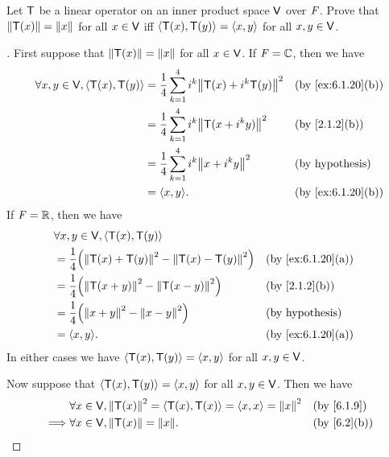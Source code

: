 \begin{ex}\label{ex:6.3.10}
  Let \(\mathsf{T}\) be a linear operator on an inner product space \(\mathsf{V}\) over \(\mathit{F}\).
  Prove that \(\left\lVert\mathsf{T}(x)\right\rVert = \left\lVert x\right\rVert\) for all \(x \in \mathsf{V}\) iff \(\left\langle\mathsf{T}(x), \mathsf{T}(y)\right\rangle = \left\langle x,y\right\rangle\) for all \(x, y \in \mathsf{V}\).
\end{ex}

\begin{proof}[]
  First suppose that \(\left\lVert\mathsf{T}(x)\right\rVert = \left\lVert x\right\rVert\) for all \(x \in \mathsf{V}\).
  If \(\mathit{F} = \mathbb{C}\), then we have
  \begin{align*}
    \forall x, y \in \V, \inn{\T(x), \T(y)} & = \dfrac{1}{4} \sum_{k = 1}^4 i^k \norm{\T(x) + i^k \T(y)}^2 &  & \by{ex:6.1.20}[b]      \\
                                            & = \dfrac{1}{4} \sum_{k = 1}^4 i^k \norm{\T(x + i^k y)}^2     &  & \by{2.1.2}[b]          \\
                                            & = \dfrac{1}{4} \sum_{k = 1}^4 i^k \norm{x + i^k y}^2         &  & \text{(by hypothesis)} \\
                                            & = \inn{x, y}.                                                &  & \by{ex:6.1.20}[b]
  \end{align*}
  If \(\mathit{F} = \mathbb{R}\), then we have
  \begin{align*}
     & \forall x, y \in \V, \inn{\T(x), \T(y)}                                                         \\
     & = \dfrac{1}{4} \pa{\norm{\T(x) + \T(y)}^2 - \norm{\T(x) - \T(y)}^2} &  & \by{ex:6.1.20}[a]      \\
     & = \dfrac{1}{4} \pa{\norm{\T(x + y)}^2 - \norm{\T(x - y)}^2}         &  & \by{2.1.2}[b]          \\
     & = \dfrac{1}{4} \pa{\norm{x + y}^2 - \norm{x - y}^2}                 &  & \text{(by hypothesis)} \\
     & = \inn{x, y}.                                                       &  & \by{ex:6.1.20}[a]
  \end{align*}
  In either cases we have \(\left\langle\mathsf{T}(x), \mathsf{T}(y)\right\rangle = \left\langle x, y\right\rangle\) for all \(x, y \in \mathsf{V}\).

  Now suppose that \(\left\langle\mathsf{T}(x), \mathsf{T}(y)\right\rangle = \left\langle x, y\right\rangle\) for all \(x, y \in \mathsf{V}\).
  Then we have
  \begin{align*}
             & \forall x \in \V, \norm{\T(x)}^2 = \inn{\T(x), \T(x)} = \inn{x, x} = \norm{x}^2 &  & \by{6.1.9}  \\
    \implies & \forall x \in \V, \norm{\T(x)} = \norm{x}.                                      &  & \by{6.2}[b]
  \end{align*}
\end{proof}

